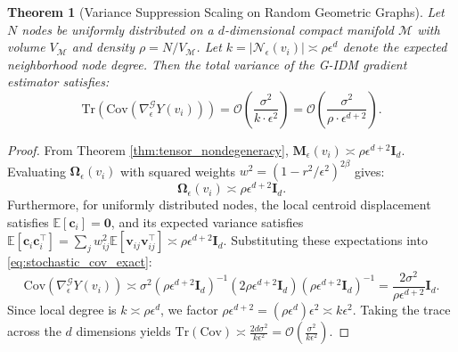 \documentclass[11pt,a4paper]{article}
\newtheorem{theorem}{Theorem}
\theoremstyle{definition}
\begin{document}
\begin{theorem}[Variance Suppression Scaling on Random Geometric Graphs]
\label{thm:variance_scaling}
Let $N$ nodes be uniformly distributed on a $d$-dimensional compact manifold $\mathcal{M}$ with volume $V_{\mathcal{M}}$ and density $\rho = N / V_{\mathcal{M}}$.
Let $k = |\mathcal{N}_\epsilon(v_i)| \asymp \rho \epsilon^d$ denote the expected neighborhood node degree. 
Then the total variance of the G-IDM gradient estimator satisfies:
\begin{equation}
\text{Tr}\left(\text{Cov}\left(\nabla_\epsilon^{\mathcal{G}} Y(v_i)\right)\right) = \mathcal{O}\left( \frac{\sigma^2}{k \cdot \epsilon^2} \right) = \mathcal{O}\left( \frac{\sigma^2}{\rho \cdot \epsilon^{d+2}} \right).
\label{eq:variance_decay_rate}
\end{equation}
\end{theorem}

\begin{proof}
From Theorem \ref{thm:tensor_nondegeneracy}, $\mathbf{M}_\epsilon(v_i) \asymp \rho \epsilon^{d+2} \mathbf{I}_d$.
Evaluating $\mathbf{\Omega}_\epsilon(v_i)$ with squared weights $w^2 = (1 - r^2/\epsilon^2)^{2\beta}$ gives:
\begin{equation}
\mathbf{\Omega}_\epsilon(v_i) \asymp \rho \epsilon^{d+2} \mathbf{I}_d.
\end{equation}
Furthermore, for uniformly distributed nodes, the local centroid displacement satisfies $\mathbb{E}[\mathbf{c}_i] = \mathbf{0}$, and its expected variance satisfies $\mathbb{E}[\mathbf{c}_i \mathbf{c}_i^\top] = \sum_{j} w_{ij}^2 \mathbb{E}[\mathbf{v}_{ij} \mathbf{v}_{ij}^\top] \asymp \rho \epsilon^{d+2} \mathbf{I}_d$.
Substituting these expectations into \eqref{eq:stochastic_cov_exact}:
\begin{equation}
\text{Cov}\left(\nabla_\epsilon^{\mathcal{G}} Y(v_i)\right) \asymp \sigma^2 \left( \rho \epsilon^{d+2} \mathbf{I}_d \right)^{-1} \left( 2\rho \epsilon^{d+2} \mathbf{I}_d \right) \left( \rho \epsilon^{d+2} \mathbf{I}_d \right)^{-1} = \frac{2\sigma^2}{\rho \epsilon^{d+2}} \mathbf{I}_d.
\end{equation}
Since local degree is $k \asymp \rho \epsilon^d$, we factor $\rho \epsilon^{d+2} = (\rho \epsilon^d) \epsilon^2 \asymp k \epsilon^2$. 
Taking the trace across the $d$ dimensions yields $\text{Tr}(\text{Cov}) \asymp \frac{2d \sigma^2}{k \epsilon^2} = \mathcal{O}\left( \frac{\sigma^2}{k \epsilon^2} \right)$.
\end{proof}
\end{document}
